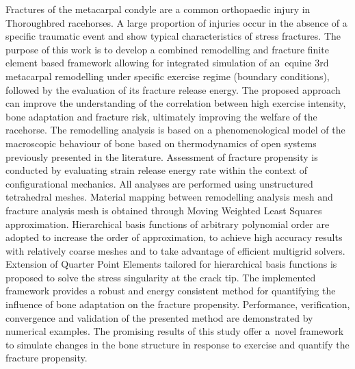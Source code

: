 \documentclass[11pt]{acmeArticle}
\numberwithin{equation}{section}
\begin{document}
{\small 
	Fractures of the metacarpal condyle are a common orthopaedic injury in Thoroughbred racehorses.  
	A large proportion of injuries occur in the absence of a specific traumatic event and show typical characteristics of stress fractures. 
	The purpose of this work is to develop a combined remodelling and fracture finite element based framework allowing for integrated simulation of an~equine 3rd metacarpal remodelling under specific exercise regime (boundary conditions), followed by the evaluation of its fracture release energy. 
	The proposed approach can improve the understanding of the correlation between high exercise intensity, bone adaptation and fracture 
	risk, ultimately improving the welfare of the racehorse. 
	The remodelling analysis is based on a phenomenological model of the macroscopic behaviour of bone based on thermodynamics of open 
	systems previously presented in the literature. 
	Assessment of fracture propensity is conducted by evaluating strain release energy rate within the context of configurational mechanics. 
	All analyses are performed using unstructured tetrahedral meshes. 
	Material mapping between remodelling analysis mesh and fracture analysis mesh is obtained through Moving Weighted Least Squares approximation. 
	Hierarchical basis functions of arbitrary polynomial order are adopted to increase the order of approximation, to achieve high 
	accuracy results with relatively coarse meshes and to take advantage of efficient multigrid solvers.
	Extension of Quarter Point Elements tailored for hierarchical basis functions is proposed to solve the stress singularity at the 
	crack tip.
	The implemented framework provides a robust and energy consistent method for quantifying the influence of bone adaptation on the
	 fracture propensity.
	Performance, verification, convergence and validation of the presented method are demonstrated by numerical examples.
	The promising results of this study offer a~novel framework to simulate changes in the bone structure in response to exercise and 
	quantify the fracture propensity.
	 
	
}
\end{document}

